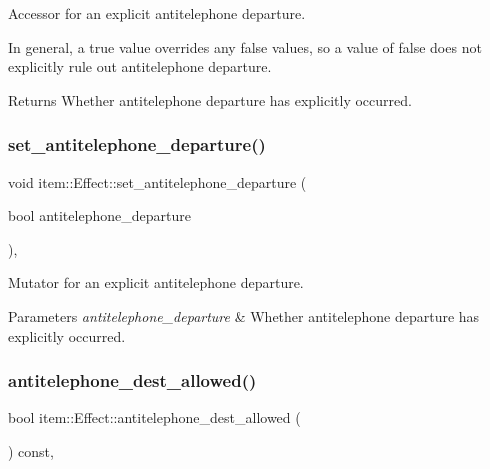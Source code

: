 Accessor for an explicit antitelephone departure. 

In general, a {\ttfamily true} value overrides any {\ttfamily false} values, so a value of {\ttfamily false} does not explicitly rule out antitelephone departure. \begin{DoxyReturn}{Returns}
Whether antitelephone departure has explicitly occurred. 
\end{DoxyReturn}
\mbox{\label{classitem_1_1_effect_a209135cb3afb7f25dfd56c5b7c9e2ffd}} 
\subsubsection{\texorpdfstring{set\+\_\+antitelephone\+\_\+departure()}{set\_antitelephone\_departure()}}
{\footnotesize\ttfamily void item\+::\+Effect\+::set\+\_\+antitelephone\+\_\+departure (\begin{DoxyParamCaption}\item[{bool}]{antitelephone\+\_\+departure }\end{DoxyParamCaption})\hspace{0.3cm}{\ttfamily [inline]}, {\ttfamily [noexcept]}}



Mutator for an explicit antitelephone departure. 


\begin{DoxyParams}{Parameters}
{\em antitelephone\+\_\+departure} & Whether antitelephone departure has explicitly occurred. \\
\hline
\end{DoxyParams}
\mbox{\label{classitem_1_1_effect_acb90e76e736868dd5307e8b6fe7e2e0d}} 
\subsubsection{\texorpdfstring{antitelephone\+\_\+dest\+\_\+allowed()}{antitelephone\_dest\_allowed()}}
{\footnotesize\ttfamily bool item\+::\+Effect\+::antitelephone\+\_\+dest\+\_\+allowed (\begin{DoxyParamCaption}{ }\end{DoxyParamCaption}) const\hspace{0.3cm}{\ttfamily [inline]}, {\ttfamily [noexcept]}}



